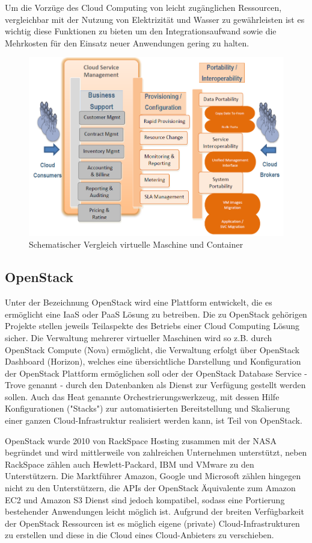 Um die Vorzüge des Cloud Computing von leicht zugänglichen Ressourcen, vergleichbar mit der Nutzung von Elektrizität und Wasser zu gewährleisten ist es wichtig diese Funktionen zu bieten um den Integrationsaufwand sowie die Mehrkosten für den Einsatz neuer Anwendungen gering zu halten.

\begin{figure}
	\centering
	\includegraphics[width=0.8\linewidth]{images/portability}
	\caption{Schematischer Vergleich virtuelle Maschine und Container}
	\label{fig:portability}
\end{figure}

\subsection{OpenStack}
Unter der Bezeichnung OpenStack wird eine Plattform entwickelt, die es ermöglicht eine IaaS oder PaaS Lösung zu betreiben. Die zu OpenStack gehörigen Projekte stellen jeweils Teilaspekte des Betriebs einer Cloud Computing Lösung sicher. Die Verwaltung mehrerer virtueller Maschinen wird so z.B. durch OpenStack Compute (Nova) ermöglicht, die Verwaltung erfolgt über OpenStack Dashboard (Horizon), welches eine übersichtliche Darstellung und Konfiguration der OpenStack Plattform ermöglichen soll oder der OpenStack Database Service - Trove genannt - durch den Datenbanken als Dienst zur Verfügung gestellt werden sollen. Auch das Heat genannte Orchestrierungswerkzeug, mit dessen Hilfe Konfigurationen ("Stacks") zur automatisierten Bereitstellung und Skalierung einer ganzen Cloud-Infrastruktur realisiert werden kann, ist Teil von OpenStack.

OpenStack wurde 2010 von RackSpace Hosting zusammen mit der NASA begründet und wird mittlerweile von zahlreichen Unternehmen unterstützt, neben RackSpace zählen auch Hewlett-Packard, IBM und VMware zu den Unterstützern. Die Marktführer Amazon, Google und Microsoft zählen hingegen nicht zu den Unterstützern, die APIs der OpenStack Äquivalente zum Amazon EC2 und Amazon S3 Dienst sind jedoch kompatibel, sodass eine Portierung bestehender Anwendungen leicht möglich ist. Aufgrund der breiten Verfügbarkeit der OpenStack Ressourcen ist es möglich eigene (private) Cloud-Infrastrukturen zu erstellen und diese in die Cloud eines Cloud-Anbieters zu verschieben.

